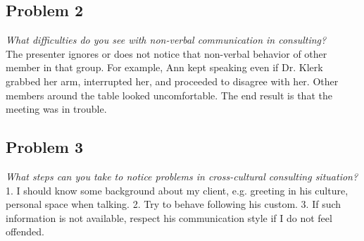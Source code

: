 \documentclass[a4paper,11pt]{article}
\begin{document}
\subsection*{Problem 2}
\emph{\indent What difficulties do you see with non-verbal communication in consulting?}\\

The presenter  ignores or does not notice that non-verbal behavior of other member in that group. For example, Ann kept speaking even if Dr. Klerk grabbed her arm, interrupted her, and proceeded to disagree with her. Other members around the table looked uncomfortable. The end result is that the meeting was in trouble.

\subsection*{Problem 3}
\emph{\indent What steps can you take to notice problems in cross-cultural consulting situation?}\\

1. I should know some background about my client, e.g. greeting in his culture, personal space when talking.
2. Try to behave following his custom.
3. If such information is not available, respect his communication style if I do not feel offended.
\end{document}
